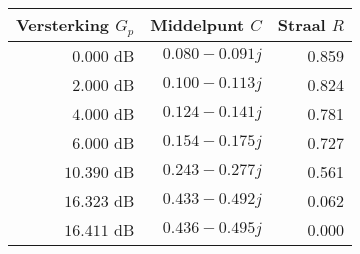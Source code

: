 \begin{tabular}{|r|r|r|} \hline 
\textbf{Versterking $G_p$} & \textbf{Middelpunt $C$} & \textbf{Straal $R$} \\ \hline 
$ 0.000$ \mbox{dB} & $ 0.080 -0.091 j$ &  0.859 \\ \hline 
$ 2.000$ \mbox{dB} & $ 0.100 -0.113 j$ &  0.824 \\ \hline 
$ 4.000$ \mbox{dB} & $ 0.124 -0.141 j$ &  0.781 \\ \hline 
$ 6.000$ \mbox{dB} & $ 0.154 -0.175 j$ &  0.727 \\ \hline 
$10.390$ \mbox{dB} & $ 0.243 -0.277 j$ &  0.561 \\ \hline 
$16.323$ \mbox{dB} & $ 0.433 -0.492 j$ &  0.062 \\ \hline 
$16.411$ \mbox{dB} & $ 0.436 -0.495 j$ &  0.000 \\ \hline 
\end{tabular}
